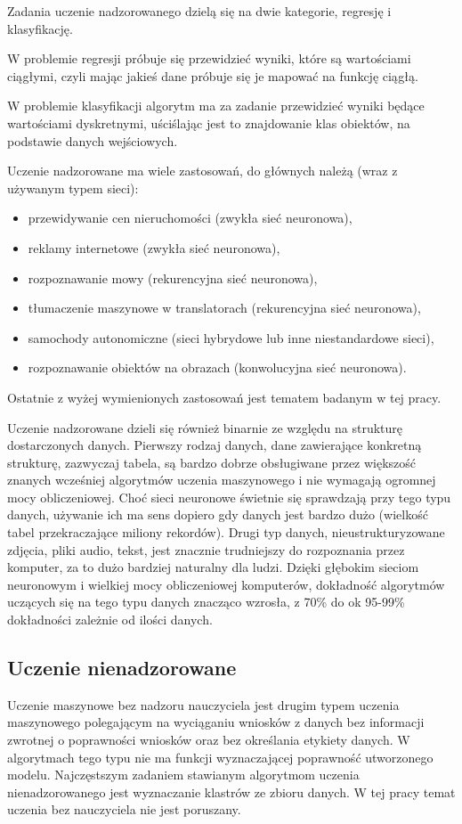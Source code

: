 \documentclass[12pt,a4paper,twoside,titlepage,openright]{book}
\begin{document}
Zadania uczenie nadzorowanego dzielą się na dwie kategorie, regresję i klasyfikację. 

W problemie regresji próbuje się przewidzieć wyniki, które są wartościami ciągłymi, czyli mając jakieś dane próbuje się je mapować na funkcję ciągłą. 

W problemie klasyfikacji algorytm ma za zadanie przewidzieć wyniki będące wartościami dyskretnymi, uściślając jest to znajdowanie klas obiektów, na podstawie danych wejściowych.

Uczenie nadzorowane ma wiele zastosowań, do głównych należą (wraz z używanym typem sieci):
\begin{itemize}
\item przewidywanie cen nieruchomości (zwykła sieć neuronowa),
\item reklamy internetowe (zwykła sieć neuronowa),
\item rozpoznawanie mowy (rekurencyjna sieć neuronowa),
\item tłumaczenie maszynowe w translatorach (rekurencyjna sieć neuronowa),
\item samochody autonomiczne (sieci hybrydowe lub inne niestandardowe sieci),
\item rozpoznawanie obiektów na obrazach (konwolucyjna sieć neuronowa).
\end{itemize}
Ostatnie z wyżej wymienionych zastosowań jest tematem badanym w tej pracy.

Uczenie nadzorowane dzieli się również binarnie ze względu na strukturę dostarczonych danych. Pierwszy rodzaj danych, dane zawierające konkretną strukturę, zazwyczaj tabela, są bardzo dobrze obsługiwane przez większość znanych wcześniej algorytmów uczenia maszynowego i nie wymagają ogromnej mocy obliczeniowej. Choć sieci neuronowe świetnie się sprawdzają przy tego typu danych, używanie ich ma sens dopiero gdy danych jest bardzo dużo (wielkość tabel przekraczające miliony rekordów). Drugi typ danych, nieustrukturyzowane zdjęcia, pliki audio, tekst, jest znacznie trudniejszy do rozpoznania przez komputer, za to dużo bardziej naturalny dla ludzi. Dzięki głębokim sieciom neuronowym i wielkiej mocy obliczeniowej komputerów, dokładność algorytmów uczących się na tego typu danych znacząco wzrosła, z 70\% do ok 95-99\% dokładności zależnie od ilości danych.

\subsection*{Uczenie nienadzorowane}
Uczenie maszynowe bez nadzoru nauczyciela jest drugim typem uczenia maszynowego polegającym na wyciąganiu wniosków z danych bez informacji zwrotnej o poprawności wniosków oraz bez określania etykiety danych. W algorytmach tego typu nie ma funkcji wyznaczającej poprawność utworzonego modelu. Najczęstszym zadaniem stawianym algorytmom uczenia nienadzorowanego jest wyznaczanie klastrów ze zbioru danych. W tej pracy temat uczenia bez nauczyciela nie jest poruszany.
\end{document}
